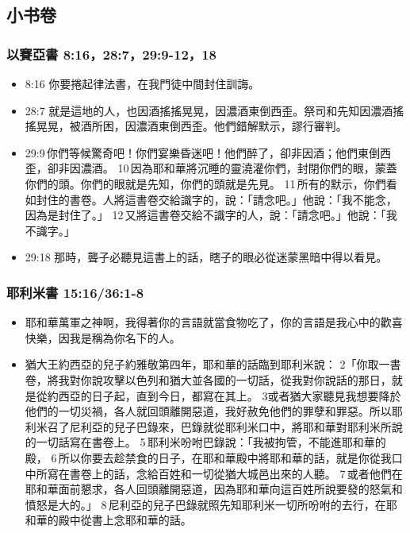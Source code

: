 \subsection{小书卷}

\subsubsection{以賽亞書 8:16，28:7，29:9-12，18}
\begin{itemize}
\itemsep-.25em
\item 8:16 你要捲起律法書，在我門徒中間封住訓誨。
\item 28:7 就是這地的人，也因酒搖搖晃晃，因濃酒東倒西歪。祭司和先知因濃酒搖搖晃晃，被酒所困，因濃酒東倒西歪。他們錯解默示，謬行審判。
\item 29:9 你們等候驚奇吧！你們宴樂昏迷吧！他們醉了，卻非因酒；他們東倒西歪，卻非因濃酒。 10 因為耶和華將沉睡的靈澆灌你們，封閉你們的眼，蒙蓋你們的頭。你們的眼就是先知，你們的頭就是先見。 11 所有的默示，你們看如封住的書卷。人將這書卷交給識字的，說：「請念吧。」他說：「我不能念，因為是封住了。」 12 又將這書卷交給不識字的人，說：「請念吧。」他說：「我不識字。」
\item 29:18 那時，聾子必聽見這書上的話，瞎子的眼必從迷蒙黑暗中得以看見。
\end{itemize}

\subsubsection{耶利米書 15:16/36:1-8}
\begin{itemize}
\itemsep-.25em
\item 耶和華萬軍之神啊，我得著你的言語就當食物吃了，你的言語是我心中的歡喜快樂，因我是稱為你名下的人。
\item 猶大王約西亞的兒子約雅敬第四年，耶和華的話臨到耶利米說： 2「你取一書卷，將我對你說攻擊以色列和猶大並各國的一切話，從我對你說話的那日，就是從約西亞的日子起，直到今日，都寫在其上。 3或者猶大家聽見我想要降於他們的一切災禍，各人就回頭離開惡道，我好赦免他們的罪孽和罪惡。所以耶利米召了尼利亞的兒子巴錄來，巴錄就從耶利米口中，將耶和華對耶利米所說的一切話寫在書卷上。 5 耶利米吩咐巴錄說：「我被拘管，不能進耶和華的殿， 6 所以你要去趁禁食的日子，在耶和華殿中將耶和華的話，就是你從我口中所寫在書卷上的話，念給百姓和一切從猶大城邑出來的人聽。 7 或者他們在耶和華面前懇求，各人回頭離開惡道，因為耶和華向這百姓所說要發的怒氣和憤怒是大的。」 8 尼利亞的兒子巴錄就照先知耶利米一切所吩咐的去行，在耶和華的殿中從書上念耶和華的話。
\end{itemize}

